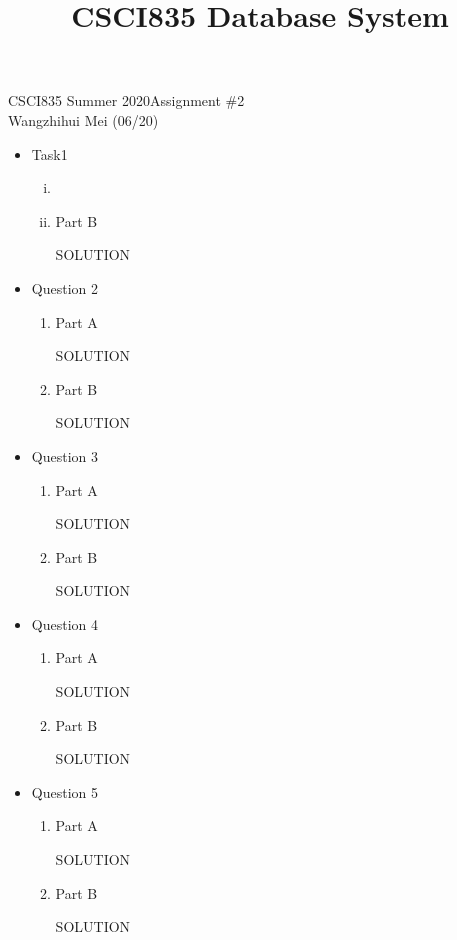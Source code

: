 \documentclass[12pt]{article}
\title{CSCI835 Database System}
\begin{document}
CSCI835 Summer 2020\hfill Assignment \#2\\
Wangzhihui Mei (06/20)

\hrulefill

\begin{itemize}
\item Task1
  \begin{enumerate}[(i)]
  \item 
    
  \item Part B

  SOLUTION
  \end{enumerate}
\newpage

\item Question 2
  \begin{enumerate}
  \item Part A

  SOLUTION

  \item Part B

  SOLUTION
  \end{enumerate}
\newpage

\item Question 3
  \begin{enumerate}
  \item Part A

  SOLUTION

  \item Part B

  SOLUTION
  \end{enumerate}
\newpage

\item Question 4
  \begin{enumerate}
  \item Part A

  SOLUTION

  \item Part B

  SOLUTION
  \end{enumerate}
\newpage

\item Question 5
  \begin{enumerate}
  \item Part A

  SOLUTION

  \item Part B

  SOLUTION
  \end{enumerate}
\newpage

\end{itemize}
\end{document}
